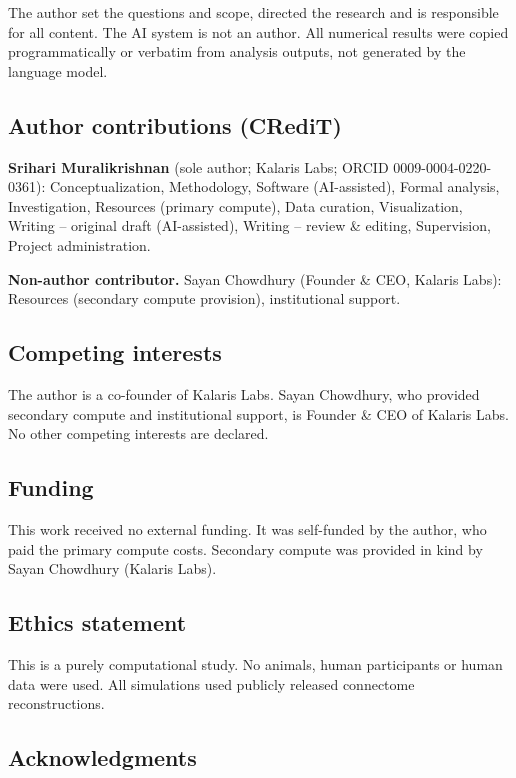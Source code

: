 \documentclass[11pt]{article}
\begin{document}
The author set the questions and scope, directed the research and is responsible for all content. The AI system is not an author. All numerical results were copied programmatically or verbatim from analysis outputs, not generated by the language model.

\subsection{Author contributions (CRediT)}\label{author-contributions-credit}

\textbf{Srihari Muralikrishnan} (sole author; Kalaris Labs; ORCID 0009-0004-0220-0361): Conceptualization, Methodology, Software (AI-assisted), Formal analysis, Investigation, Resources (primary compute), Data curation, Visualization, Writing -- original draft (AI-assisted), Writing -- review \& editing, Supervision, Project administration.

\textbf{Non-author contributor.} Sayan Chowdhury (Founder \& CEO, Kalaris Labs): Resources (secondary compute provision), institutional support.

\subsection{Competing interests}\label{competing-interests}

The author is a co-founder of Kalaris Labs. Sayan Chowdhury, who provided secondary compute and institutional support, is Founder \& CEO of Kalaris Labs. No other competing interests are declared.

\subsection{Funding}\label{funding}

This work received no external funding. It was self-funded by the author, who paid the primary compute costs. Secondary compute was provided in kind by Sayan Chowdhury (Kalaris Labs).

\subsection{Ethics statement}\label{ethics-statement}

This is a purely computational study. No animals, human participants or human data were used. All simulations used publicly released connectome reconstructions.

\subsection{Acknowledgments}\label{acknowledgments}
\end{document}
